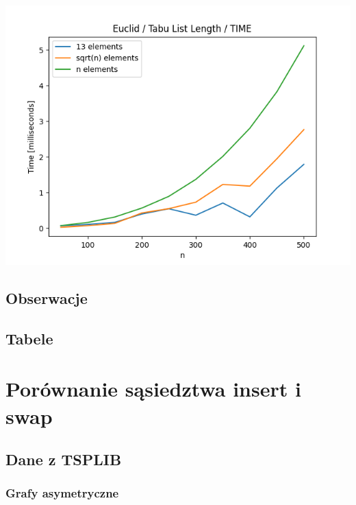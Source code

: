 \documentclass{article}
\begin{document}
\begin{center}
\includegraphics[width=\textwidth, 
                   height = 0.4\textheight, 
                   keepaspectratio]
                  {plots/tabu_euclid_time} 
\end{center}

\subsection{Obserwacje}

\subsection{Tabele}



\section{Porównanie sąsiedztwa insert i swap}

\subsection{Dane z TSPLIB}

\subsubsection{Grafy asymetryczne}
\end{document}
